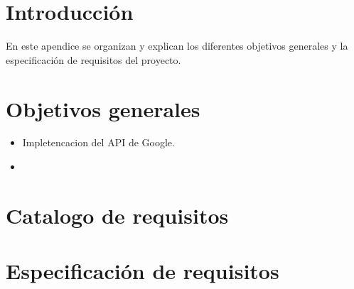
\section{Introducción}
En este apendice se organizan y explican los diferentes objetivos generales y la especificación de requisitos del proyecto.

\section{Objetivos generales}

\begin{itemize}
    \item Impletencacion del API de Google.
    \item 
\end{itemize}

\section{Catalogo de requisitos}

\section{Especificación de requisitos}


